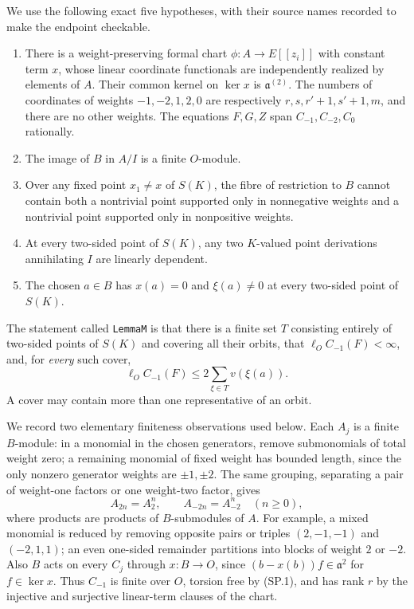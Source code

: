 We use the following exact five hypotheses, with their source names
recorded to make the endpoint checkable.
\begin{enumerate}
\item[(M1)] There is a weight-preserving formal chart
$\phi:A\to E[[z_i]]$ with constant term $x$, whose linear coordinate
functionals are independently realized by elements of $A$.  Their
common kernel on $\ker x$ is $\mathfrak a^{(2)}$.  The numbers of
coordinates of weights $-1,-2,1,2,0$ are respectively
$r,s,r'+1,s'+1,m$, and there are no other weights.  The equations
$F,G,Z$ span $C_{-1},C_{-2},C_0$ rationally.
\item[(M2)] The image of $B$ in $A/I$ is a finite $O$-module.
\item[(M3)] Over any fixed point $x_1\ne x$ of $S(K)$, the fibre of
restriction to $B$ cannot contain both a nontrivial point supported
only in nonnegative weights and a nontrivial point supported only in
nonpositive weights.
\item[(M4)] At every two-sided point of $S(K)$, any two $K$-valued
point derivations annihilating $I$ are linearly dependent.
\item[(M5)] The chosen $a\in B$ has $x(a)=0$ and $\xi(a)\ne0$ at
every two-sided point of $S(K)$.
\end{enumerate}
The statement called \texttt{LemmaM} is that there is a finite set
$T$ consisting entirely of two-sided points of $S(K)$ and covering
all their orbits, that
$\ell_OC_{-1}(F)<\infty$, and, for \emph{every} such cover,
\[
                    \ell_OC_{-1}(F)\le2\sum_{\xi\in T}v(\xi(a)).
 \tag{SP.7}
\]
A cover may contain more than one representative of an orbit.

We record two elementary finiteness observations used below.  Each
$A_j$ is a finite $B$-module: in a monomial in the chosen generators,
remove submonomials of total weight zero; a remaining monomial of
fixed weight has bounded length, since the only nonzero generator
weights are $\pm1,\pm2$.  The same grouping, separating a pair of
weight-one factors or one weight-two factor, gives
\[
                       A_{2n}=A_2^n,\qquad A_{-2n}=A_{-2}^n
                       \quad(n\ge0),
 \tag{SP.8}
\]
where products are products of $B$-submodules of $A$.
For example, a mixed monomial is reduced by removing opposite pairs
or triples $(2,-1,-1)$ and $(-2,1,1)$; an even one-sided remainder
partitions into blocks of weight $2$ or $-2$.
Also $B$ acts on every $C_j$ through $x:B\to O$, since
$(b-x(b))f\in\mathfrak a^2$ for $f\in\ker x$.  Thus $C_{-1}$ is
finite over $O$, torsion free by (SP.1), and has rank $r$ by the
injective and surjective linear-term clauses of the chart.

